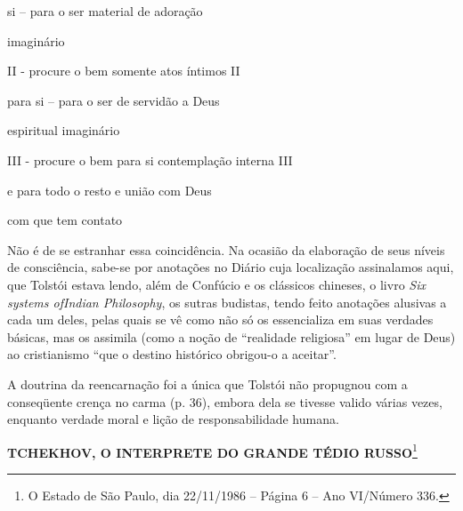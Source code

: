 si -- para o ser material de adoração

imaginário

II - procure o bem somente atos íntimos II

para si -- para o ser de servidão a Deus

espiritual imaginário

III - procure o bem para si contemplação interna III

e para todo o resto e união com Deus

com que tem contato

Não é de se estranhar essa coincidência. Na ocasião da elaboração de
seus níveis de consciência, sabe-se por anotações no Diário cuja
localização assinalamos aqui, que Tolstói estava lendo, além de Confúcio
e os clássicos chineses, o livro \emph{Six systems ofIndian Philosophy},
os sutras budistas, tendo feito anotações alusivas a cada um deles,
pelas quais se vê como não só os essencializa em suas verdades básicas,
mas os assimila (como a noção de ``realidade religiosa'' em lugar de
Deus) ao cristianismo ``que o destino histórico obrigou-o a aceitar''.

A doutrina da reencarnação foi a única que Tolstói não propugnou com a
conseqüente crença no carma (p. 36), embora dela se tivesse valido
várias vezes, enquanto verdade moral e lição de responsabilidade humana.

\textbf{TCHEKHOV, O INTERPRETE DO GRANDE TÉDIO RUSSO}\footnote{O Estado
  de São Paulo, dia 22/11/1986 -- Página 6 -- Ano VI/Número 336.}

